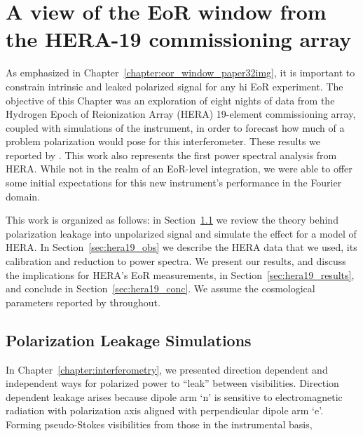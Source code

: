 \chapter{A view of the EoR window from the HERA-19 commissioning array}
\label{chapter:eor_window_HERA}

As emphasized in Chapter~\ref{chapter:eor_window_paper32img}, it is important to constrain intrinsic and leaked polarized signal for any {\sc hi} EoR experiment. 
The objective of this Chapter was an exploration of eight nights of data from the Hydrogen Epoch of Reionization Array (HERA) 19-element commissioning array, coupled with simulations of the instrument, in order to forecast how much of a problem polarization would pose for this interferometer. These results we reported by \cite{Kohn.18}.
This work also represents the first power spectral analysis from HERA. While not in the realm of an EoR-level integration, we were able to offer some initial expectations for this new instrument's performance in the Fourier domain.

This work is organized as follows: in Section~\ref{sec:hera19_leak} we review the theory behind polarization leakage into unpolarized signal and simulate the effect for a model of HERA. In Section~\ref{sec:hera19_obs} we describe the HERA data that we used, its calibration and reduction to power spectra. We present our results, and discuss the implications for HERA's EoR measurements, in Section~\ref{sec:hera19_results}, and conclude in Section~\ref{sec:hera19_conc}. We assume the cosmological parameters reported by \cite{Planck.16} throughout.

\section{Polarization Leakage Simulations}
\label{sec:hera19_leak}

In Chapter~\ref{chapter:interferometry}, we presented direction dependent and independent ways for polarized power to ``leak'' between visibilities. Direction dependent leakage arises because dipole arm `n' is sensitive to electromagnetic radiation with polarization axis aligned with perpendicular dipole arm `e'. Forming pseudo-Stokes visibilities from those in the instrumental basis,

